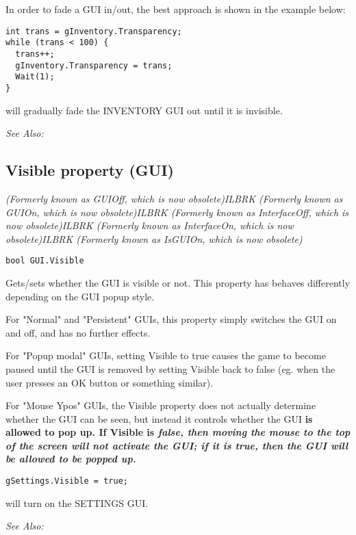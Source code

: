 In order to fade a GUI in/out, the best approach is shown in the example below:

\begin{verbatim}
int trans = gInventory.Transparency;
while (trans < 100) {
  trans++;
  gInventory.Transparency = trans;
  Wait(1);
}
\end{verbatim}
will gradually fade the INVENTORY GUI out until it is invisible.

\it{See Also:} 


\subsection{Visible property (GUI)}\label{GUI.Visible}%

\it{(Formerly known as GUIOff, which is now obsolete)}ILBRK
\it{(Formerly known as GUIOn, which is now obsolete)}ILBRK
\it{(Formerly known as InterfaceOff, which is now obsolete)}ILBRK
\it{(Formerly known as InterfaceOn, which is now obsolete)}ILBRK
\it{(Formerly known as IsGUIOn, which is now obsolete)}

\begin{verbatim}
bool GUI.Visible
\end{verbatim}
Gets/sets whether the GUI is visible or not. This property has behaves
differently depending on the GUI popup style.

For "Normal" and "Persistent" GUIs, this property simply switches the GUI
on and off, and has no further effects.

For "Popup modal" GUIs, setting Visible to true causes the game to become paused
until the GUI is removed by setting Visible back to false (eg. when the user
presses an OK button or something similar).

For "Mouse Ypos" GUIs, the Visible property does not actually determine whether
the GUI can be seen, but instead it controls whether the GUI \bf{is allowed to} pop up.
If Visible is \it{false}, then moving the mouse to the top of the screen will not activate
the GUI; if it is \it{true}, then the GUI will be allowed to be popped up.

\begin{verbatim}
gSettings.Visible = true;
\end{verbatim}
will turn on the SETTINGS GUI.

\it{See Also:} 


